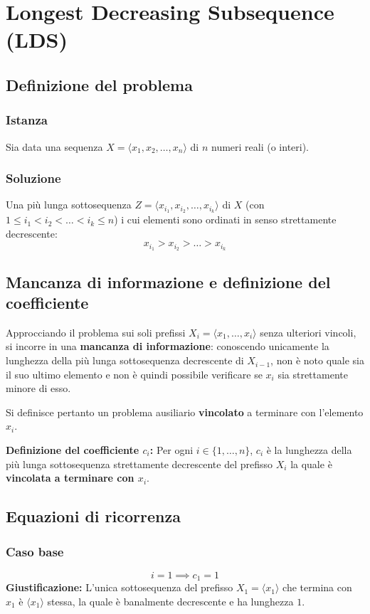 \chapter{Longest Decreasing Subsequence (LDS)}

\section{Definizione del problema}

\subsection{Istanza}
Sia data una sequenza $X = \langle x_1, x_2, \dots, x_n \rangle$ di $n$ numeri reali (o interi).

\subsection{Soluzione}
Una più lunga sottosequenza $Z = \langle x_{i_1}, x_{i_2}, \dots, x_{i_k} \rangle$ di $X$ (con $1 \le i_1 < i_2 < \dots < i_k \le n$) i cui elementi sono ordinati in senso strettamente decrescente:
\[
    x_{i_1} > x_{i_2} > \dots > x_{i_k}
\]

\section{Mancanza di informazione e definizione del coefficiente}
Approcciando il problema sui soli prefissi $X_i = \langle x_1, \dots, x_i \rangle$ senza ulteriori vincoli, si incorre in una \textbf{mancanza di informazione}: conoscendo unicamente la lunghezza della più lunga sottosequenza decrescente di $X_{i-1}$, non è noto quale sia il suo ultimo elemento e non è quindi possibile verificare se $x_i$ sia strettamente minore di esso.

Si definisce pertanto un problema ausiliario \textbf{vincolato} a terminare con l'elemento $x_i$.

\medskip
\noindent
\textbf{Definizione del coefficiente $c_i$:} Per ogni $i \in \{1, \dots, n\}$, $c_i$ è la lunghezza della più lunga sottosequenza strettamente decrescente del prefisso $X_i$ la quale è \textbf{vincolata a terminare con $x_i$}.

\section{Equazioni di ricorrenza}

\subsection{Caso base}
\[
    i = 1 \implies c_1 = 1
\]
\textbf{Giustificazione:} L'unica sottosequenza del prefisso $X_1 = \langle x_1 \rangle$ che termina con $x_1$ è $\langle x_1 \rangle$ stessa, la quale è banalmente decrescente e ha lunghezza $1$.

